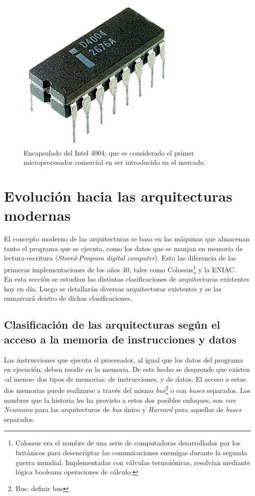 \begin{figure}
  \centering
  \includegraphics[scale=0.5]{./figures/C02-intel_4004}
  \captionsetup{justification=centering}
  \caption{Encapsulado del Intel 4004; que es considerado el primer microprocesador comercial en ser introducido en el mercado.}
  \label{fig:C02-intel_4004}
\end{figure}

\section{Evolución hacia las arquitecturas modernas}

El concepto moderno de las arquitecturas se basa en las máquinas que almacenan tanto el programa que se ejecuta, como los datos que se manjan en memoria de lectura-escritura (\emph{Stored-Program digital computer}). Esto las diferencia de las primeras implementaciones de los años 40, tales como Colossus\footnote{Colossus era el nombre de una serie de computadoras desarrolladas por los británicos para desencriptar las comunicaciones enemigas durante la segunda guerra mundial. Implementadas con válvulas termoiónicas, resolvían mediante lógica booleana operaciones de cálculo.} y la ENIAC.\\
En esta sección se estudian las distintas clasificaciones de arquitecturas existentes hoy en día. Luego se detallarán diversas arquitecturas existentes y se las enmarcará dentro de dichas clasificaciones.

\subsection{Clasificación de las arquitecturas según el acceso a la memoria de instrucciones y datos}

Las instrucciones que ejecuta el procesador, al igual que los datos del programa en ejecución, deben residir en la memoria. De este hecho se desprende que existen -al menos- dos tipos de memorias: de instrucciones, y de datos. El acceso a estas dos memorias puede realizarse a través del mismo \emph{bus}\footnote{Bus: definir bus} o con \emph{buses} separados. Los nombres que la historia les ha provisto a estos dos posibles enfoques, son \emph{von Neumann} para las arquitecturas de \emph{bus} único y \emph{Harvard} para aquellas de \emph{buses} separados.

